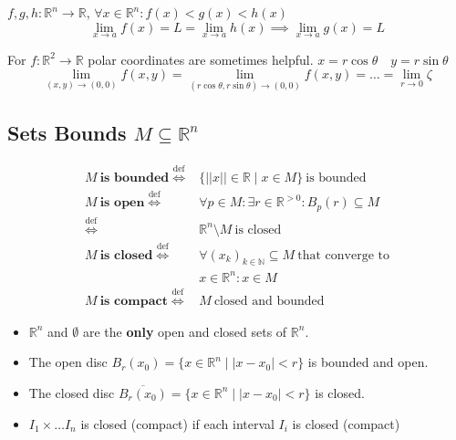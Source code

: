 \documentclass[a4paper, 10pt]{article}
\theoremstyle{definition}
\newcommand{\R}{\mathbb{R}}
\newcommand{\N}{\mathbb{N}}
\newcommand{\defi}{\stackrel{\text{def}}{\iff}}
\begin{document}
\begin{ntheorem*}
    \(f, g, h : \R^n \to \R\), \(\forall x \in \R^n: f(x) < g(x) < h(x)\)
    \[\lim_{x \to a} f(x) = L = \lim_{x \to a} h(x) \implies \lim_{x \to a}g(x) = L\]
\end{ntheorem*}

\begin{note*}
    For \(f: \R^2 \to \R\) polar coordinates are sometimes helpful.
    \(x = r \cos \theta \quad y = r \sin \theta\)
    \[\lim_{(x, y) \to (0, 0)}f(x, y) = \lim_{(r\cos\theta, r\sin\theta)  \to (0,0)}f(x, y) = \ldots = \lim_{r \to 0} \zeta\]
\end{note*}

\subsection*{Sets Bounds \(M \subseteq \R^n\)}
\vspace{-8pt}
\begin{align*}
    M \ \textbf{is bounded} \defi & \{||x|| \in \R \mid x \in M\} \ \text{is bounded} \\
    M \ \textbf{is open} \defi & \forall p \in M: \exists r \in \R^{>0}: B_p(r) \subseteq M \\
    \defi & \R^n \setminus M \ \text{is closed}\\
    M \ \textbf{is closed} \defi & \forall (x_k)_{k \in \N} \subseteq M \ \text{that converge to} \\
    & x \in \R^n: x \in M \\
    M \ \textbf{is compact} \defi& M \ \text{closed and bounded}
\end{align*}

\begin{note*}
    \begin{itemize}
        \item \(\R^n\) and \(\emptyset\) are the \textbf{only} open and  closed sets of \(\R^n\).
        \item The open disc \(B_r(x_0) = \{x \in \R^n \mid |x - x_0| < r\}\) is bounded and open.
        \item The closed disc \(\overline{B_r(x_0)} = \{x \in \R^n \mid |x - x_0| < r\}\) is closed.
        \item \(I_1 \times \ldots I_n\) is closed (compact) if each interval \(I_i\) is closed (compact)
    \end{itemize}
\end{note*}
\end{document}
